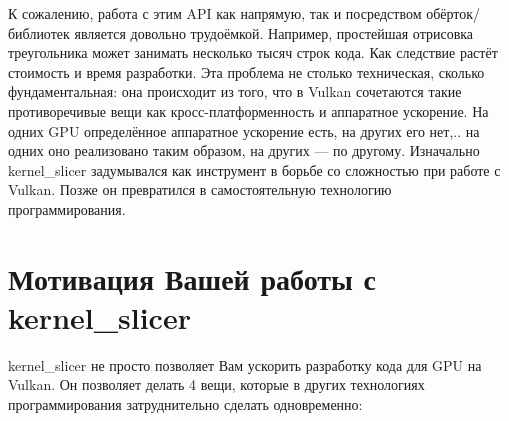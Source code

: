 \documentclass[11pt,fleqn,english,russian]{report} %
\begin{document}

К сожалению, работа с этим API как напрямую, так и посредством обёрток/библиотек является довольно трудоёмкой. Например, простейшая отрисовка треугольника может занимать несколько тысяч строк кода. Как следствие растёт стоимость и время разработки. Эта проблема не столько техническая, сколько фундаментальная: она происходит из того, что в Vulkan сочетаются такие противоречивые вещи как кросс-платформенность и аппаратное ускорение. На одних GPU определённое аппаратное ускорение есть, на других его нет,.. на одних оно реализовано таким образом, на других --- по другому. Изначально kernel\_slicer задумывался как инструмент в борьбе со сложностью при работе с Vulkan. Позже он превратился в самостоятельную технологию программирования.

\section{Мотивация Вашей работы с kernel\_slicer }

kernel\_slicer не просто позволяет Вам ускорить разработку кода для GPU на Vulkan. Он позволяет делать 4 вещи, которые в других технологиях программирования затруднительно сделать одновременно:
\end{document}
